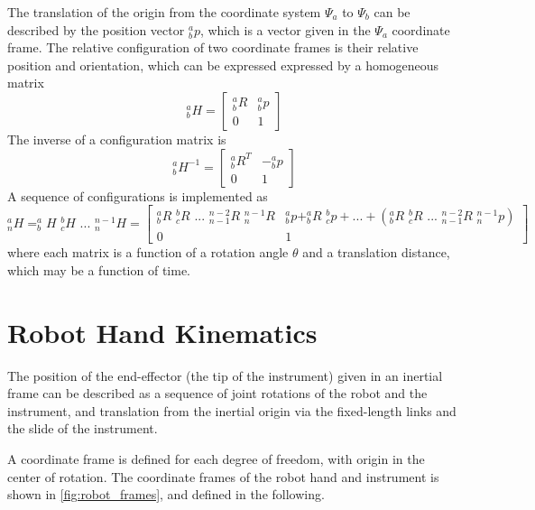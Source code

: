 The translation of the origin from the coordinate system $\Psi_a$ to $\Psi_b$ can be described by the position vector $^a_bp$, which is a vector given in the $\Psi_a$ coordinate frame.
The relative configuration of two coordinate frames is their relative position and orientation, which can be expressed expressed by a homogeneous matrix
\begin{equation}
^a_bH = 
\begin{bmatrix}
^a_bR & ^a_bp\\
0 & 1
\end{bmatrix}
\end{equation}
The inverse of a configuration matrix is
\begin{equation}
^a_bH^{-1} = 
\begin{bmatrix}
^a_bR^T & -^a_bp\\
0 & 1
\end{bmatrix}
\end{equation}
A sequence of configurations is implemented as
\begin{equation}
^a_nH = ^a_bH \,\, ^b_cH \,\,...\,\, ^{n-1}_nH = 
\begin{bmatrix}
^a_bR \,\, ^b_cR \,\,...\,\, ^{n-2}_{n-1}R \,\,^{n-1}_nR & ^a_bp + ^a_bR \,\, ^b_cp + ... + (^a_bR\,\, ^b_cR \,\,...\,\, ^{n-2}_{n-1}R \,\, ^{n-1}_np )\\
0 & 1
\end{bmatrix}
\end{equation}
where each matrix is a function of a rotation angle $\theta$ and a translation distance, which may be a function of time.


 



\section{Robot Hand Kinematics}
The position of the end-effector (the tip of the instrument) given in an inertial frame can be described as a sequence of joint rotations of the robot and the instrument, and translation from the inertial origin via the fixed-length links and the slide of the instrument.

A coordinate frame is defined for each degree of freedom, with origin in the center of rotation. The coordinate frames of the robot hand and instrument is shown in \autoref{fig:robot_frames}, and defined in the following.

